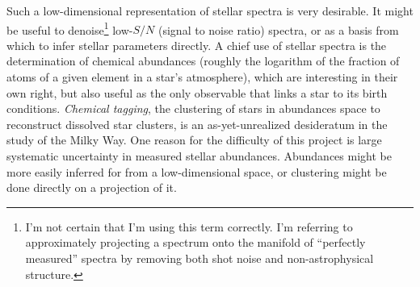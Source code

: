 \documentclass[12pt]{article}
\begin{document}
Such a low-dimensional representation of stellar spectra is very desirable.
It might be useful to denoise\footnote{I'm not certain that I'm using this term correctly.  I'm referring to approximately projecting a spectrum onto the manifold of ``perfectly measured'' spectra by removing both shot noise and non-astrophysical structure.}
low-$S/N$ (signal to noise ratio) spectra, or as a basis from which to infer stellar parameters directly.
A chief use of stellar spectra is the determination of chemical abundances (roughly the logarithm of the fraction of atoms of a given element in a star's atmosphere), which are interesting in their own right, but also useful as the only observable that links a star to its birth conditions.
\emph{Chemical tagging}, the clustering of stars in abundances space to reconstruct dissolved star clusters, is an as-yet-unrealized desideratum in the study of the Milky Way.
One reason for the difficulty of this project is large systematic uncertainty in measured stellar abundances.
Abundances might be more easily inferred for from a low-dimensional space, or clustering might be done directly on a projection of it.
\end{document}
